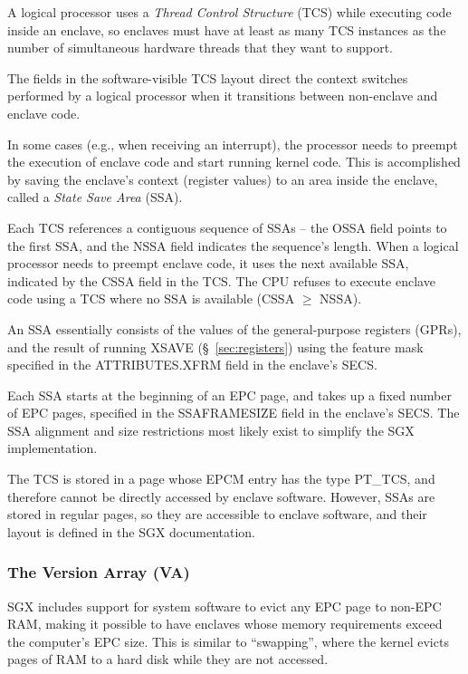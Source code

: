 
A logical processor uses a \textit{Thread Control Structure} (TCS) while
executing code inside an enclave, so enclaves must have at least as many TCS
instances as the number of simultaneous hardware threads that they want to
support.

The fields in the software-visible TCS layout direct the context switches
performed by a logical processor when it transitions between non-enclave and
enclave code.


In some cases (e.g., when receiving an interrupt), the processor needs to
preempt the execution of enclave code and start running kernel code. This is
accomplished by saving the enclave's context (register values) to an area
inside the enclave, called a \textit{State Save Area} (SSA).

Each TCS references a contiguous sequence of SSAs -- the OSSA field points to
the first SSA, and the NSSA field indicates the sequence's length. When a
logical processor needs to preempt enclave code, it uses the next available
SSA, indicated by the CSSA field in the TCS. The CPU refuses to execute enclave
code using a TCS where no SSA is available (CSSA $\ge$ NSSA).

An SSA essentially consists of the values of the general-purpose registers
(GPRs), and the result of running XSAVE (\S~\ref{sec:registers}) using the
feature mask specified in the ATTRIBUTES.XFRM field in the enclave's SECS.


Each SSA starts at the beginning of an EPC page, and takes up a fixed number of
EPC pages, specified in the SSAFRAMESIZE field in the enclave's SECS. The SSA
alignment and size restrictions most likely exist to simplify the SGX
implementation.

The TCS is stored in a page whose EPCM entry has the type PT\_TCS, and
therefore cannot be directly accessed by enclave software. However, SSAs are
stored in regular pages, so they are accessible to enclave software, and their
layout is defined in the SGX documentation.

\subsubsection{The Version Array (VA)}
\label{sec:va}

SGX includes support for system software to evict any EPC page to non-EPC RAM,
making it possible to have enclaves whose memory requirements exceed the
computer's EPC size. This is similar to ``swapping'', where the kernel evicts
pages of RAM to a hard disk while they are not accessed.


